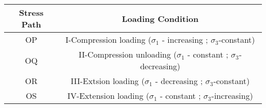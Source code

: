 \begin{table}[ht]
    \centering
 
    \begin{tabular}{c|c} 
        Stress Path & Loading Condition \\
        \hline
        OP & I-Compression loading ($\sigma_{1}$ - increasing ; $\sigma_{3}$-constant) \\ 
       OQ & II-Compression unloading ($\sigma_{1}$ - constant ; $\sigma_{3}$-decreasing) \\ 
       OR & III-Extsion loading ($\sigma_{1}$ - decreasing ; $\sigma_{3}$-constant) \\ 
       OS & IV-Extension loading ($\sigma_{1}$ - constant ; $\sigma_{3}$-increasing) \\ 
       
        \hline 
    \end{tabular}
\end{table}


